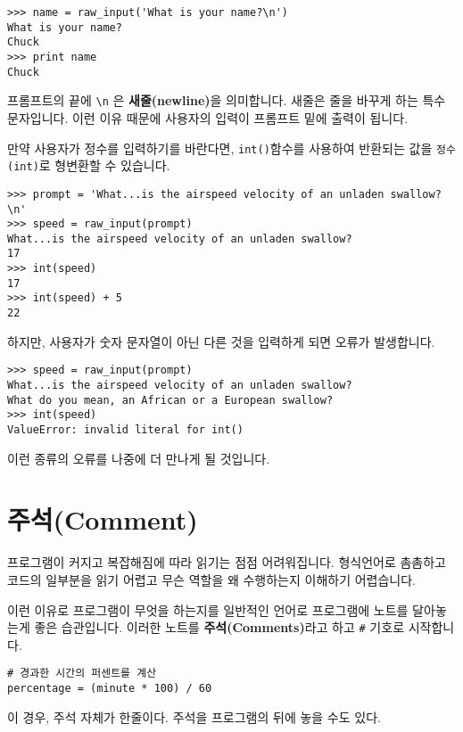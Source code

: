 
\beforeverb
\begin{verbatim}
>>> name = raw_input('What is your name?\n')
What is your name?
Chuck
>>> print name
Chuck
\end{verbatim}
\afterverb
%

프롬프트의 끝에 \verb"\n" 은 {\bf 새줄(newline)}을 의미합니다. 새줄은 줄을 바꾸게 하는 특수 문자입니다. 이런 이유 때문에 사용자의 입력이 프롬프트 밑에 출력이 됩니다.


만약 사용자가 정수를 입력하기를 바란다면, {\tt int()}함수를 사용하여 반환되는 값을 {\tt 정수(int)}로 형변환할 수 있습니다.

\beforeverb
\begin{verbatim}
>>> prompt = 'What...is the airspeed velocity of an unladen swallow?\n'
>>> speed = raw_input(prompt)
What...is the airspeed velocity of an unladen swallow?
17
>>> int(speed)
17
>>> int(speed) + 5
22
\end{verbatim}
\afterverb
%
하지만, 사용자가 숫자 문자열이 아닌 다른 것을 입력하게 되면 오류가 발생합니다.

\beforeverb
\begin{verbatim}
>>> speed = raw_input(prompt)
What...is the airspeed velocity of an unladen swallow?
What do you mean, an African or a European swallow?
>>> int(speed)
ValueError: invalid literal for int()
\end{verbatim}
\afterverb
%

이런 종류의 오류를 나중에 더 만나게 될 것입니다.



\section{주석(Comment)}

프로그램이 커지고 복잡해짐에 따라 읽기는 점점 어려워집니다. 형식언어로 촘촘하고 코드의 일부분을 읽기 어렵고 무슨 역할을 왜 수행하는지 이해하기 어렵습니다.

이런 이유로 프로그램이 무엇을 하는지를 일반적인 언어로 프로그램에 노트를 달아놓는게 좋은 습관입니다. 이러한 노트를 {\bf 주석(Comments)}라고 하고 \verb"#" 기호로 시작합니다.


\beforeverb
\begin{verbatim}
# 경과한 시간의 퍼센트를 계산
percentage = (minute * 100) / 60
\end{verbatim}
\afterverb
%
이 경우, 주석 자체가 한줄이다. 주석을 프로그램의 뒤에 놓을 수도 있다.

